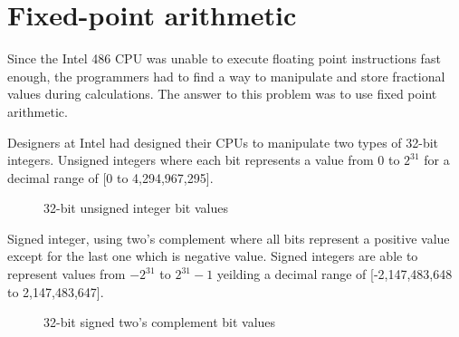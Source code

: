 \section{Fixed-point arithmetic}
Since the Intel 486 CPU was unable to execute floating point instructions fast enough, the programmers had to find a way to manipulate and store fractional values during calculations. The answer to this problem was to use fixed point arithmetic.\\
\par
Designers at Intel had designed their CPUs to manipulate two types of 32-bit integers. Unsigned integers where each bit represents a value from $0$ to $2^{31}$ for a decimal range of [0 to 4,294,967,295].\\
\par
\begin{figure}[H]
 \centering
  
 \caption{32-bit unsigned integer bit values} 
\end{figure}
\par
Signed integer, using two's complement where all bits represent a positive value except for the last one which is negative value. Signed integers are able to represent values from $-2^{31}$ to $2^{31}-1$ yeilding a decimal range of [-2,147,483,648 to 2,147,483,647].\\
\par
\begin{figure}[H]
 \centering
  
 \caption{32-bit signed two's complement bit values} 
\end{figure}
\par


